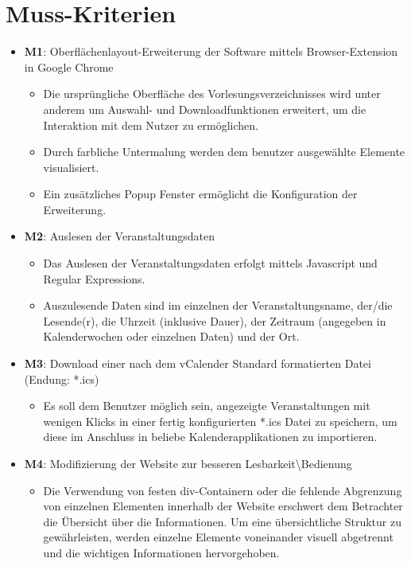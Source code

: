 \documentclass[11pt]{scrreprt}
\begin{document}
\section{Muss-Kriterien}
\begin{itemize}
\item \textbf{M1}: Oberfl\"achenlayout-Erweiterung der Software mittels Browser-Extension in Google Chrome
    \begin{itemize}
    \item Die urspr\"ungliche Oberfläche des Vorlesungsverzeichnisses wird unter anderem um Auswahl- und Downloadfunktionen erweitert, um die Interaktion mit dem Nutzer zu erm\"oglichen.
    \item Durch farbliche Untermalung werden dem benutzer ausgew\"ahlte Elemente visualisiert.
    \item Ein zus\"atzliches Popup Fenster erm\"oglicht die Konfiguration der Erweiterung.
    \end{itemize}
\item \textbf{M2}: Auslesen der Veranstaltungsdaten
    \begin{itemize}
    \item Das Auslesen der Veranstaltungsdaten erfolgt mittels Javascript und Regular Expressions.
    \item Auszulesende Daten sind im einzelnen der Veranstaltungsname, der/die Lesende(r), die Uhrzeit (inklusive Dauer), der Zeitraum (angegeben in Kalenderwochen oder einzelnen Daten) und der Ort.
    \end{itemize}
\item \textbf{M3}: Download einer nach dem vCalender Standard formatierten Datei (Endung: *.ics)
    \begin{itemize}
    \item Es soll dem Benutzer m\"oglich sein, angezeigte Veranstaltungen mit wenigen Klicks in einer fertig konfigurierten *.ics Datei zu speichern, um diese im Anschluss in beliebe Kalenderapplikationen zu importieren.
    \end{itemize}
\item \textbf{M4}: Modifizierung der Website zur besseren Lesbarkeit\textbackslash Bedienung
    \begin{itemize}
    \item Die Verwendung von festen div-Containern oder die fehlende Abgrenzung von einzelnen Elementen innerhalb der Website erschwert dem Betrachter die \"Ubersicht \"uber die Informationen. Um eine \"ubersichtliche Struktur zu gew\"ahrleisten, werden einzelne Elemente voneinander visuell abgetrennt und die wichtigen Informationen hervorgehoben.
    \end{itemize}
\end{itemize}
\end{document}
